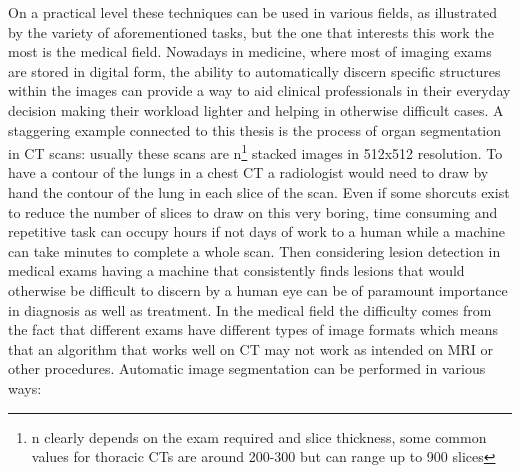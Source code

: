 On a practical level these techniques can be used in various fields, as illustrated by the variety of aforementioned tasks, but the one that interests this work the most is the medical field.
Nowadays in medicine, where most of imaging exams are stored in digital form, the ability to automatically discern specific structures within the images can provide a way to aid clinical professionals in their everyday decision making their workload lighter and helping in otherwise difficult cases.
A staggering example connected to this thesis is the process of organ segmentation in CT scans: usually these scans are n\footnote{n clearly depends on the exam required and slice thickness, some common values for thoracic CTs are around 200-300 but can range up to 900 slices} stacked images in 512x512 resolution. To have a contour of the lungs in a chest CT a radiologist would need to draw by hand the contour of the lung in each slice of the scan. Even if some shorcuts exist to reduce the number of slices to draw on this very boring, time consuming and repetitive task can occupy hours if not days of work to a human  while a machine can take minutes to complete a whole scan. Then considering lesion detection in medical exams having a machine that consistently finds lesions that would otherwise be difficult to discern by a human eye can be of paramount importance in diagnosis as well as treatment.
In the medical field the difficulty comes from the fact that different exams have different types of image formats which means that an algorithm that works well on CT may not work as intended on MRI or other procedures.
Automatic image segmentation can be performed in various ways:

